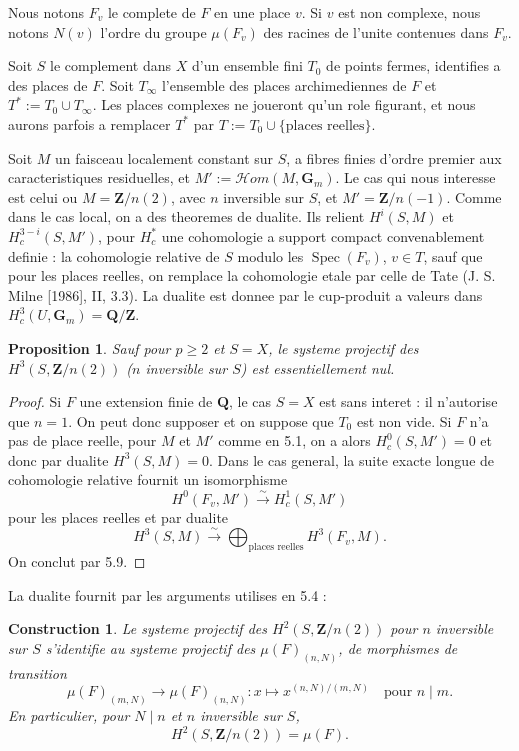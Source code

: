 \documentclass[11pt,a4paper]{article}
\theoremstyle{plain}
\newtheorem{proposition}[theorem]{Proposition}
\newtheorem{construction}[theorem]{Construction}
\theoremstyle{definition}
\DeclareMathOperator{\Spec}{Spec}
\begin{document}
Nous notons $F_v$ le complete de $F$ en une place $v$. Si $v$ est non complexe, nous notons $N(v)$ l'ordre du groupe $\mu(F_v)$ des racines de l'unite contenues dans $F_v$.

Soit $S$ le complement dans $X$ d'un ensemble fini $T_0$ de points fermes, identifies a des places de $F$. Soit $T_\infty$ l'ensemble des places archimediennes de $F$ et $T^* := T_0 \cup T_\infty$. Les places complexes ne joueront qu'un role figurant, et nous aurons parfois a remplacer $T^*$ par $T := T_0 \cup \{\text{places reelles}\}$.

Soit $M$ un faisceau localement constant sur $S$, a fibres finies d'ordre premier aux caracteristiques residuelles, et $M' := \mathscr{H}om(M, \mathbf{G}_m)$. Le cas qui nous interesse est celui ou $M = \mathbf{Z}/n(2)$, avec $n$ inversible sur $S$, et $M' = \mathbf{Z}/n(-1)$. Comme dans le cas local, on a des theoremes de dualite. Ils relient $H^i(S, M)$ et $H^{3-i}_c(S, M')$, pour $H^*_c$ une cohomologie a support compact convenablement definie : la cohomologie relative de $S$ modulo les $\Spec(F_v)$, $v \in T$, sauf que pour les places reelles, on remplace la cohomologie etale par celle de Tate (J. S. Milne [1986], II, 3.3). La dualite est donnee par le cup-produit a valeurs dans $H^3_c(U, \mathbf{G}_m) = \mathbf{Q}/\mathbf{Z}$.

\begin{proposition}\label{6.2}
Sauf pour $p \geq 2$ et $S = X$, le systeme projectif des $H^3(S, \mathbf{Z}/n(2))$ ($n$ inversible sur $S$) est essentiellement nul.
\end{proposition}

\begin{proof}
Si $F$ une extension finie de $\mathbf{Q}$, le cas $S = X$ est sans interet : il n'autorise que $n = 1$. On peut donc supposer et on suppose que $T_0$ est non vide. Si $F$ n'a pas de place reelle, pour $M$ et $M'$ comme en 5.1, on a alors $H^0_c(S, M') = 0$ et donc par dualite $H^3(S, M) = 0$. Dans le cas general, la suite exacte longue de cohomologie relative fournit un isomorphisme
\[
H^0(F_v, M') \xrightarrow{\sim} H^1_c(S, M')
\]
pour les places reelles
et par dualite
\[
H^3(S, M) \xrightarrow{\sim} \bigoplus_{\text{places reelles}} H^3(F_v, M).
\]
On conclut par 5.9.
\end{proof}

La dualite fournit par les arguments utilises en 5.4 :

\begin{construction}\label{6.3}
Le systeme projectif des $H^2(S, \mathbf{Z}/n(2))$ pour $n$ inversible sur $S$ s'identifie au systeme projectif des $\mu(F)_{(n,N)}$, de morphismes de transition
\[
\mu(F)_{(m,N)} \to \mu(F)_{(n,N)} : x \mapsto x^{(n,N)/(m,N)} \quad \text{pour } n \mid m.
\]
En particulier, pour $N \mid n$ et $n$ inversible sur $S$,
\begin{equation}\label{6.3.1}
H^2(S, \mathbf{Z}/n(2)) = \mu(F).
\end{equation}
\end{construction}
\end{document}

